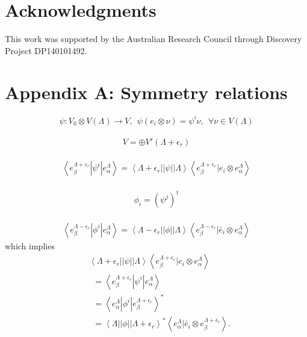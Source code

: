\documentclass[12pt]{article}
\begin{document}
%
%
%
\section*{Acknowledgments}
%
This work was supported by the Australian Research Council through Discovery Project
DP140101492. 
%
%
%
%
%
\newpage
\section*{Appendix A: Symmetry relations}
$$
\psi: V_0 \otimes V(\Lambda) \rightarrow V, ~~ \psi(e_i \otimes \nu) = \psi^i \nu, ~~\forall \nu \in V(\Lambda)
$$
~~\\
$$
V = \oplus V'(\Lambda + \epsilon_r)
$$
~~
\begin{align*}
\left\langle e_\beta^{\Lambda  + \epsilon_r} | \psi^i | e^{\Lambda}_\alpha \right\rangle 
= \left \langle \Lambda + \epsilon_r || \psi || \Lambda \right \rangle
\left\langle e^{\Lambda+\epsilon_r}_\beta | e_i \otimes e^{\Lambda}_\alpha \right\rangle
\end{align*}
~~
$$
\phi_i = (\psi^j)^\dagger
$$
~~
\begin{align*}
\left\langle e_\beta^{\Lambda  - \epsilon_r} | \phi^i | e^{\Lambda}_\alpha \right\rangle 
= \left \langle \Lambda - \epsilon_r || \phi || \Lambda \right \rangle
\left\langle e^{\Lambda-\epsilon_r}_\beta | \bar{e}_i \otimes e^{\Lambda}_\alpha \right\rangle
\end{align*}
which implies
~~
\begin{align*}
&\left \langle \Lambda + \epsilon_r || \psi || \Lambda \right \rangle
\left\langle e^{\Lambda+\epsilon_r}_\beta | e_i \otimes e^{\Lambda}_\alpha \right\rangle \\
&~~= \left\langle e_\beta^{\Lambda  + \epsilon_r} | \psi^i | e^{\Lambda}_\alpha \right\rangle \\
&~~= \left\langle e_\alpha^{\Lambda} | \phi^i | e^{\Lambda + \epsilon_r}_\beta \right\rangle^*\\
&~~=\left \langle \Lambda || \phi || \Lambda + \epsilon_r \right \rangle^*
\left\langle e^{\Lambda}_\alpha | \bar{e}_i \otimes e^{\Lambda+\epsilon_r}_\beta \right\rangle.
\end{align*}
\end{document}

